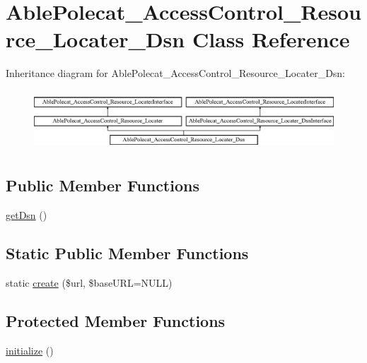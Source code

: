 \hypertarget{class_able_polecat___access_control___resource___locater___dsn}{}\section{Able\+Polecat\+\_\+\+Access\+Control\+\_\+\+Resource\+\_\+\+Locater\+\_\+\+Dsn Class Reference}
\label{class_able_polecat___access_control___resource___locater___dsn}
Inheritance diagram for Able\+Polecat\+\_\+\+Access\+Control\+\_\+\+Resource\+\_\+\+Locater\+\_\+\+Dsn\+:\begin{figure}[H]
\begin{center}
\leavevmode
\includegraphics[height=2.282609cm]{class_able_polecat___access_control___resource___locater___dsn}
\end{center}
\end{figure}
\subsection*{Public Member Functions}
\begin{DoxyCompactItemize}
\item 
\hyperlink{class_able_polecat___access_control___resource___locater___dsn_a4a0bf8061a4ee59b487f17625cb37e13}{get\+Dsn} ()
\end{DoxyCompactItemize}
\subsection*{Static Public Member Functions}
\begin{DoxyCompactItemize}
\item 
static \hyperlink{class_able_polecat___access_control___resource___locater___dsn_af3a9a1be2aeb050fe1457eb821ecd4f7}{create} (\$url, \$base\+U\+R\+L=N\+U\+L\+L)
\end{DoxyCompactItemize}
\subsection*{Protected Member Functions}
\begin{DoxyCompactItemize}
\item 
\hyperlink{class_able_polecat___access_control___resource___locater___dsn_a91098fa7d1917ce4833f284bbef12627}{initialize} ()
\end{DoxyCompactItemize}
